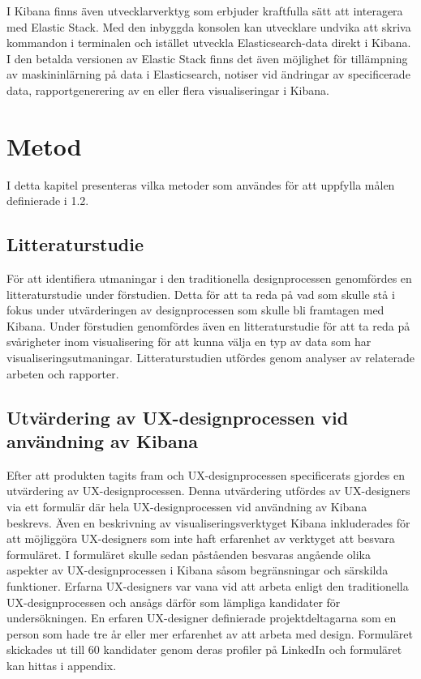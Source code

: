 \documentclass[12pt]{kththesis}
\begin{document}
I Kibana finns även utvecklarverktyg som erbjuder kraftfulla sätt att interagera med Elastic Stack. Med den inbyggda konsolen kan utvecklare undvika att skriva kommandon i terminalen och istället utveckla Elasticsearch-data direkt i Kibana. I den betalda versionen av Elastic Stack finns det även möjlighet för tillämpning av maskininlärning på data i Elasticsearch, notiser vid ändringar av specificerade data, rapportgenerering av en eller flera visualiseringar i Kibana.

\afterpage{\null\newpage}
\chapter{Metod}

I detta kapitel presenteras vilka metoder som användes för att uppfylla målen definierade i 1.2.

\section{Litteraturstudie}

För att identifiera utmaningar i den traditionella designprocessen genomfördes en litteraturstudie under förstudien. Detta för att ta reda på vad som skulle stå i fokus under utvärderingen av designprocessen som skulle bli framtagen med Kibana. Under förstudien genomfördes även en litteraturstudie för att ta reda på svårigheter inom visualisering för att kunna välja en typ av data som har visualiseringsutmaningar. Litteraturstudien utfördes genom analyser av relaterade arbeten och rapporter.

\section{Utvärdering av UX-designprocessen vid användning av Kibana}

Efter att produkten tagits fram och UX-designprocessen specificerats gjordes en utvärdering av UX-designprocessen. Denna utvärdering utfördes av UX-designers via ett formulär där hela UX-designprocessen vid användning av Kibana beskrevs. Även en beskrivning av visualiseringsverktyget Kibana inkluderades för att möjliggöra UX-designers som inte haft erfarenhet av verktyget att besvara formuläret. I formuläret skulle sedan påståenden besvaras angående olika aspekter av UX-designprocessen i Kibana såsom begränsningar och särskilda funktioner. Erfarna UX-designers var vana vid att arbeta enligt den traditionella UX-designprocessen och ansågs därför som lämpliga kandidater för undersökningen. En erfaren UX-designer definierade projektdeltagarna som en person som hade tre år eller mer erfarenhet av att arbeta med design. Formuläret skickades ut till 60 kandidater genom deras profiler på LinkedIn och formuläret kan hittas i appendix.
\end{document}

